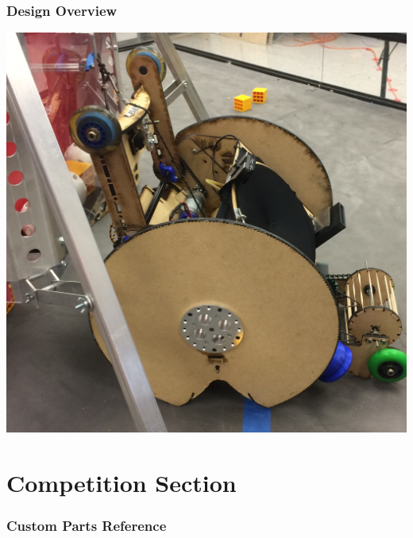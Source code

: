 \documentclass[
letterpaper, %
11pt, %
onecolumn, %
openany, %
]{article}
\begin{document}
\section{Design Overview}
\vspace{3em}
\begin{minipage}[c]{\linewidth}
\centering
\includegraphics[width=\linewidth]{Images/RobotPics/janbigwheel.jpg}
\end{minipage}








\cleardoublepage




\part{Competition Section}

% 
% 
% 
% 
% 
\cleardoublepage
{}
\appendix

\section{Custom Parts Reference}



\listoffigures
\end{document}
